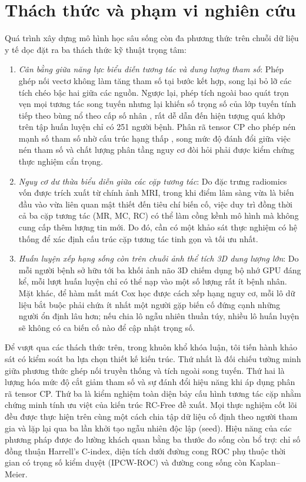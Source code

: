 \section{Thách thức và phạm vi nghiên cứu}
Quá trình xây dựng mô hình học sâu sống còn đa phương thức trên chuỗi dữ liệu y tế dọc đặt ra ba thách thức kỹ thuật trọng tâm:
\begin{enumerate}
\item \emph{Cân bằng giữa năng lực biểu diễn tương tác và dung lượng tham số}: Phép ghép nối vectơ không làm tăng tham số tại bước kết hợp, song lại bỏ lỡ các tích chéo bậc hai giữa các nguồn. Ngược lại, phép tích ngoài bao quát trọn vẹn mọi tương tác song tuyến nhưng lại khiến số trọng số của lớp tuyến tính tiếp theo bùng nổ theo cấp số nhân \cite{zadeh2017tensor,liu2018lowrank}, rất dễ dẫn đến hiện tượng quá khớp trên tập huấn luyện chỉ có 251 người bệnh. Phân rã tensor CP cho phép nén mạnh số tham số nhờ cấu trúc hạng thấp \cite{kolda2009tensor,liu2018lowrank}, song mức độ đánh đổi giữa việc nén tham số và chất lượng phân tầng nguy cơ đòi hỏi phải được kiểm chứng thực nghiệm cẩn trọng.
\item \emph{Nguy cơ dư thừa biểu diễn giữa các cặp tương tác}: Do đặc trưng radiomics vốn được trích xuất từ chính ảnh MRI, trong khi điểm lâm sàng vừa là biến đầu vào vừa liên quan mật thiết đến tiêu chí biến cố, việc duy trì đồng thời cả ba cặp tương tác (MR, MC, RC) có thể làm cồng kềnh mô hình mà không cung cấp thêm lượng tin mới. Do đó, cần có một khảo sát thực nghiệm có hệ thống để xác định cấu trúc cặp tương tác tinh gọn và tối ưu nhất.
\item \emph{Huấn luyện xếp hạng sống còn trên chuỗi ảnh thể tích 3D dung lượng lớn}: Do mỗi người bệnh sở hữu tới ba khối ảnh não 3D chiếm dụng bộ nhớ GPU đáng kể, mỗi lượt huấn luyện chỉ có thể nạp vào một số lượng rất ít bệnh nhân. Mặt khác, để hàm mất mát Cox học được cách xếp hạng nguy cơ, mỗi lô dữ liệu bắt buộc phải chứa ít nhất một người gặp biến cố đứng cạnh những người ổn định lâu hơn; nếu chia lô ngẫu nhiên thuần túy, nhiều lô huấn luyện sẽ không có ca biến cố nào để cập nhật trọng số.
\end{enumerate}

Để vượt qua các thách thức trên, trong khuôn khổ khóa luận, tôi tiến hành khảo sát có kiểm soát ba lựa chọn thiết kế kiến trúc. Thứ nhất là đối chiếu tường minh giữa phương thức ghép nối truyền thống và tích ngoài song tuyến. Thứ hai là lượng hóa mức độ cắt giảm tham số và sự đánh đổi hiệu năng khi áp dụng phân rã tensor CP. Thứ ba là kiểm nghiệm toàn diện bảy cấu hình tương tác cặp nhằm chứng minh tính ưu việt của kiến trúc RC-Free đề xuất. Mọi thực nghiệm cốt lõi đều được thực hiện trên cùng một cách chia tập dữ liệu cố định theo người tham gia và lặp lại qua ba lần khởi tạo ngẫu nhiên độc lập (seed). Hiệu năng của các phương pháp được đo lường khách quan bằng ba thước đo sống còn bổ trợ: chỉ số đồng thuận Harrell's C-index, diện tích dưới đường cong ROC phụ thuộc thời gian có trọng số kiểm duyệt (IPCW-ROC) và đường cong sống còn Kaplan--Meier.

